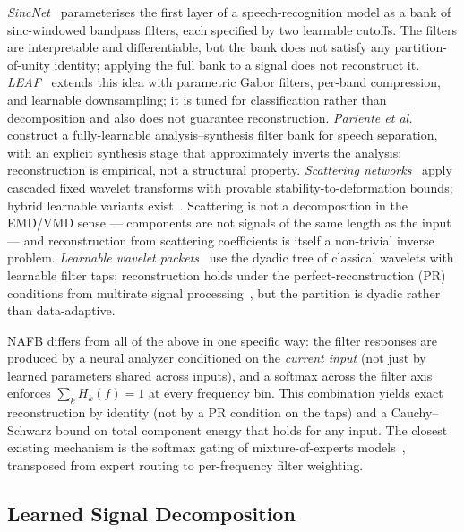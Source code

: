 \documentclass[journal]{IEEEtran}
\theoremstyle{remark}
\begin{document}
\emph{SincNet}~\cite{ravanelli2018sincnet} parameterises the first
layer of a speech-recognition model as a bank of sinc-windowed
bandpass filters, each specified by two learnable cutoffs. The
filters are interpretable and differentiable, but the bank does
not satisfy any partition-of-unity identity; applying the full bank
to a signal does not reconstruct it.
\emph{LEAF}~\cite{zeghidour2021leaf} extends this idea with
parametric Gabor filters, per-band compression, and learnable
downsampling; it is tuned for classification rather than
decomposition and also does not guarantee reconstruction.
\emph{Pariente et al.}~\cite{pariente2020filterbank} construct a
fully-learnable analysis--synthesis filter bank for speech separation,
with an explicit synthesis stage that approximately inverts the
analysis; reconstruction is empirical, not a structural property.
\emph{Scattering networks}~\cite{bruna2013invariant,anden2014scattering}
apply cascaded fixed wavelet transforms with provable
stability-to-deformation bounds; hybrid learnable variants
exist~\cite{oyallon2018scatlearn}. Scattering is not a decomposition
in the EMD/VMD sense --- components are not signals of the same length
as the input --- and reconstruction from scattering coefficients is
itself a non-trivial inverse problem. \emph{Learnable wavelet
packets}~\cite{recoskie2018learnablewavelet} use the dyadic tree of
classical wavelets with learnable filter taps; reconstruction holds
under the perfect-reconstruction (PR) conditions from multirate
signal processing~\cite{vaidyanathan1993mrsp,vetterli1995wc}, but
the partition is dyadic rather than data-adaptive.

NAFB differs from all of the above in one specific way: the filter
responses are produced by a neural analyzer conditioned on the
\emph{current input} (not just by learned parameters shared across
inputs), and a softmax across the filter axis enforces
$\sum_{k} H_{k}(f) = 1$ at every frequency bin. This combination
yields exact reconstruction by identity (not by a PR condition on the
taps) and a Cauchy--Schwarz bound on total component energy that holds
for any input. The closest existing mechanism is the softmax gating of
mixture-of-experts models~\cite{jacobs1991moe}, transposed from expert
routing to per-frequency filter weighting.

\subsection{Learned Signal Decomposition}
\end{document}
